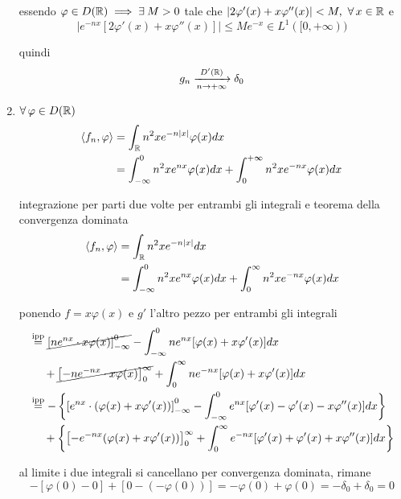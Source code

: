 \begin{enumerate}
essendo $\varphi \in D(\RR) \implies \exists M > 0$ tale che $| 2\varphi'(x) + x\varphi''(x)| < M, \ \forall x\in \RR $ e
\begin{equation*}
\left| e^{- nx}[ 2\varphi'(x) + x\varphi''(x)]\right| \leq Me^{- x} \in L^{1}([ 0, + \infty))
\end{equation*}

quindi
\begin{equation*}
g_{n}\xrightarrow[n\rightarrow + \infty ]{D'(\mathbb{R})} \delta_{0}
\end{equation*}
\item $\forall \varphi \in D(\RR)$
\begin{equation*}
\begin{aligned}
\langle f_{n}, \varphi \rangle & = \int_{\mathbb{R}} n^{2} xe^{- n| x|} \varphi (x) dx\\
 & = \int^{0}_{- \infty} n^{2} xe^{nx} \varphi (x) dx + \int^{+ \infty}_{0} n^{2} xe^{- nx} \varphi (x) dx
\end{aligned}
\end{equation*}

integrazione per parti due volte per entrambi gli integrali e teorema della convergenza dominata
\begin{align*}
\langle f_{n}, \varphi \rangle & = \int_{\mathbb{R}} n^{2} xe^{- n| x|} dx\\
 & = \int^{0}_{- \infty} n^{2} xe^{nx} \varphi (x) dx + \int^{\infty}_{0} n^{2} xe^{- nx} \varphi (x) dx
\end{align*}

ponendo $f = x\varphi (x)$ e $g'$ l'altro pezzo per entrambi gli integrali
\begin{align*}
 & \overset{\text{ipp}}{=}\cancel{\left[ ne^{nx} \cdot x\varphi (x)\right]^{0}_{- \infty}} - \int^{0}_{- \infty} ne^{nx}[ \varphi (x) + x\varphi'(x)] dx\\
 & \ \ \ \ + \cancel{\left[ - ne^{- nx} \cdot x\varphi (x)\right]^{\infty}_{0}} + \int^{\infty}_{0} ne^{- nx}[ \varphi (x) + x\varphi'(x)] dx\\
 & \overset{\text{ipp}}{=} - \left\{\left[ e^{nx} \cdot (\varphi (x) + x\varphi'(x))\right]^{0}_{- \infty} - \int^{0}_{- \infty} e^{nx}[ \varphi'(x) - \varphi'(x) - x\varphi''(x)] dx\right\}\\
 & \ \ \ \ + \left\{\left[ - e^{- nx}(\varphi (x) + x\varphi'(x))\right]^{\infty}_{0} + \int^{\infty}_{0} e^{- nx}[ \varphi'(x) + \varphi'(x) + x\varphi''(x)] dx\right\}
\end{align*}

al limite i due integrali si cancellano per convergenza dominata, rimane
\begin{equation*}
- [ \varphi (0) - 0] + [ 0 - (- \varphi (0))] = - \varphi (0) + \varphi (0) = - \delta_{0} + \delta_{0} = 0
\end{equation*}
\end{enumerate}
